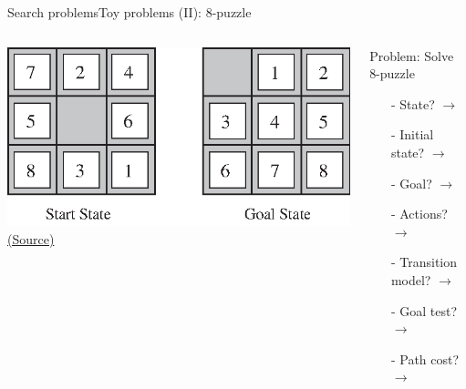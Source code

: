 \documentclass[10pt,compress]{beamer} %
\begin{document}
\begin{frame}{Search problems}{Toy problems (II): 8-puzzle}
       \begin{columns}
	            \centering \includegraphics[width=\linewidth]{figs/8puzzle.eps}\\
	            \tiny{\href{http://aima.cs.berkeley.edu/index.html}{(Source)}}
                \begin{exampleblock}{Problem: Solve 8-puzzle}
                    \begin{itemize}
                    \item[-] State? $\rightarrow$ 
                    \item[-] Initial state? $\rightarrow$ 
                    \item[-] Goal? $\rightarrow$ 
                    \item[-] Actions? $\rightarrow$ 
                    \item[-] Transition model? $\rightarrow$ 
                    \item[-] Goal test? $\rightarrow$ 
                    \item[-] Path cost? $\rightarrow$
                    \end{itemize}
                \end{exampleblock}
      \end{columns}
\end{frame}
\end{document}

